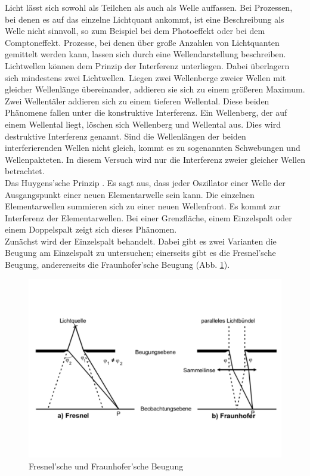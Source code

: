 Licht lässt sich sowohl als Teilchen als auch als Welle auffassen.
Bei Prozessen, bei denen es auf das einzelne Lichtquant ankommt, ist eine Beschreibung als Welle nicht sinnvoll, so zum Beispiel bei dem Photoeffekt oder bei dem Comptoneffekt.
Prozesse, bei denen über große Anzahlen von Lichtquanten gemittelt werden kann, lassen sich durch eine Wellendarstellung beschreiben.
\\Lichtwellen können dem Prinzip der Interferenz unterliegen.
Dabei überlagern sich mindestens zwei Lichtwellen.
Liegen zwei Wellenberge zweier Wellen mit gleicher Wellenlänge übereinander, addieren sie sich zu einem größeren Maximum.
Zwei Wellentäler addieren sich zu einem tieferen Wellental.
Diese beiden Phänomene fallen unter die konstruktive Interferenz.
Ein Wellenberg, der auf einem Wellental liegt, löschen sich Wellenberg und Wellental aus.
Dies wird destruktive Interferenz genannt.
Sind die Wellenlängen der beiden interferierenden Wellen nicht gleich, kommt es zu sogenannten Schwebungen und Wellenpakteten.
In diesem Versuch wird nur die Interferenz zweier gleicher Wellen betrachtet.
\\Das Huygens'sche Prinzip .
Es sagt aus, dass jeder Oszillator einer Welle der Ausgangspunkt einer neuen Elementarwelle sein kann.
Die einzelnen Elementarwellen summieren sich zu einer neuen Wellenfront.
Es kommt zur Interferenz der Elementarwellen.
Bei einer Grenzfläche, einem Einzelspalt oder einem Doppelspalt zeigt sich dieses Phänomen.
\\Zunächst wird der Einzelspalt behandelt.
Dabei gibt es zwei Varianten die Beugung am Einzelspalt zu untersuchen; einerseits gibt es die Fresnel'sche Beugung, andererseits die Fraunhofer'sche Beugung (Abb. \ref{fig:fresnelfraunhofer}).
\begin{figure}[h!]
  \centering
  \includegraphics[width=\textwidth]{fresnelfraunhofer.pdf}
  \caption{Fresnel'sche und Fraunhofer'sche Beugung \cite{1}}
  \label{fig:fresnelfraunhofer}
\end{figure}
